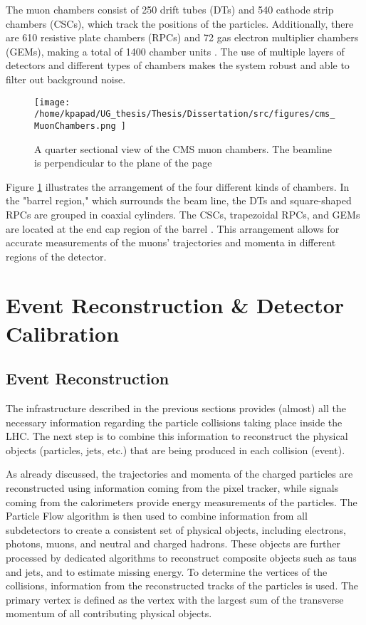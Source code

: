 The muon chambers consist of 250 drift tubes (DTs) and 540 cathode strip chambers (CSCs), which track the positions of the particles. Additionally, there are 610 resistive plate chambers (RPCs) and 72 gas electron multiplier chambers (GEMs), making a total of 1400 chamber units . The use of multiple layers of detectors and different types of chambers makes the system robust and able to filter out background noise.

\begin{figure}[h]
\centering
\texttt{[image: /home/kpapad/UG\_thesis/Thesis/Dissertation/src/figures/cms\_MuonChambers.png ]}
\caption{A quarter sectional view of the CMS muon chambers. The beamline is perpendicular to the plane of the page}
\label{fig:muon_chambers}
\end{figure}

Figure \ref{fig:muon_chambers} illustrates the arrangement of the four different kinds of chambers. In the "barrel region," which surrounds the beam line, the DTs and square-shaped RPCs are grouped in coaxial cylinders. The CSCs, trapezoidal RPCs, and GEMs are located at the end cap region of the barrel . This arrangement allows for accurate measurements of the muons' trajectories and momenta in different regions of the detector.\cite{CMSDetectingMuons}
\section{Event Reconstruction \& Detector Calibration}
\label{sec:org3fecb86}
\subsection{Event Reconstruction}
\label{sec:orgfae79d0}
The infrastructure described in the previous sections provides (almost) all the necessary information regarding the particle collisions taking place inside the LHC. The next step is to combine this information to reconstruct the physical objects (particles, jets, etc.) that are being produced in each collision (event).

As already discussed, the trajectories and momenta of the charged particles are reconstructed using information coming from the pixel tracker, while signals coming from the calorimeters provide energy measurements of the particles. The Particle Flow algorithm is then used to combine information from all subdetectors to create a consistent set of physical objects, including electrons, photons, muons, and neutral and charged hadrons. These objects are further processed by dedicated algorithms to reconstruct composite objects such as taus and jets, and to estimate missing energy. To determine the vertices of the collisions, information from the reconstructed tracks of the particles is used. The primary vertex is defined as the vertex with the largest sum of the transverse momentum of all contributing physical objects.
